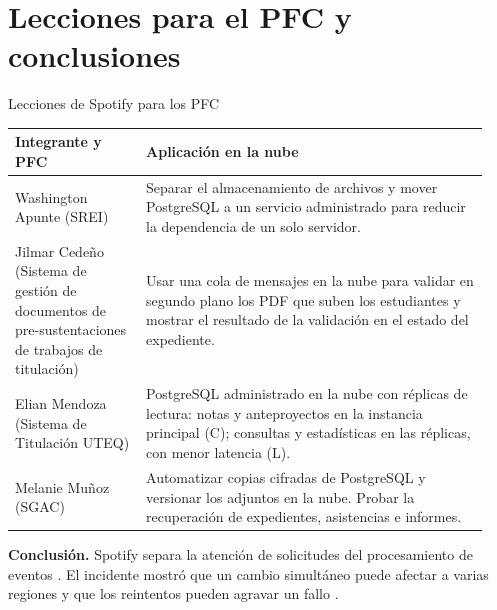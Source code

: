\section{Lecciones para el PFC y conclusiones}

\begin{frame}{Lecciones de Spotify para los PFC}
  \small
  \renewcommand{\arraystretch}{1.22}
  \begin{tabular}{@{}p{0.26\linewidth}p{0.68\linewidth}@{}}
    \toprule
    \textbf{Integrante y PFC} & \textbf{Aplicación en la nube} \\
    \midrule
    Washington Apunte (SREI) &
      Separar el almacenamiento de archivos y mover PostgreSQL a un servicio
      administrado para reducir la dependencia de un solo servidor. \\
    Jilmar Cedeño (Sistema de gestión de documentos de pre-sustentaciones
      de trabajos de titulación) &
      Usar una cola de mensajes en la nube para validar en segundo plano
      los PDF que suben los estudiantes y mostrar el resultado de la
      validación en el estado del expediente. \\
    Elian Mendoza (Sistema de Titulación UTEQ) &
      PostgreSQL administrado en la nube con réplicas de lectura: notas y
      anteproyectos en la instancia principal (C); consultas y
      estadísticas en las réplicas, con menor latencia (L). \\
    Melanie Muñoz (SGAC) &
      Automatizar copias cifradas de PostgreSQL y versionar los adjuntos
      en la nube. Probar la recuperación de expedientes, asistencias e
      informes. \\
    \bottomrule
  \end{tabular}

  \medskip
  \textbf{Conclusión.} Spotify separa la atención de solicitudes del
  procesamiento de eventos \cite{spotifyWebApiSearch,khlebnikova2024dataplatform}.
  El incidente mostró que un cambio simultáneo puede afectar a varias regiones
  y que los reintentos pueden agravar un fallo \cite{spotifyIncident2025}.
\end{frame}

